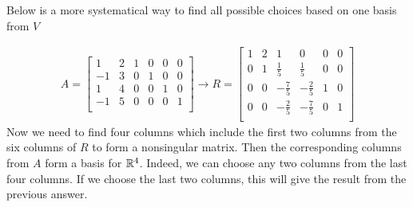\documentclass[pdf,9pt]{beamer}
\begin{document}
\begin{frame}[fragile]
    \begin{emptytitle}
    Below is a more systematical way to find all possible choices based on one basis from $V$
    \end{emptytitle}
    \vfill
    \begin{solution}[method 2.]
	\begin{align*}
	    A= \left[\begin{array}{cc|cccc}
		1  & 2 & 1 & 0 & 0 & 0 \\
		-1 & 3 & 0 & 1 & 0 & 0 \\
		1  & 4 & 0 & 0 & 1 & 0 \\
		-1 & 5 & 0 & 0 & 0 & 1 \\
	    \end{array}\right]
	    \to
	    R = \left[\begin{array}{cc|cccc}
		1 & 2 & 1            & 0            & 0 & 0 \\
		0 & 1 & \frac{1}{5}  & \frac{1}{5}  & 0 & 0 \\
		0 & 0 & -\frac{7}{5} & -\frac{2}{5} & 1 & 0 \\
		0 & 0 & -\frac{2}{5} & -\frac{7}{5} & 0 & 1 \\
	    \end{array}\right]
	\end{align*}
	Now we need to find four columns which include the first two columns from the six
	columns of $R$ to form a nonsingular matrix. Then the corresponding columns from $A$ form a basis for $\mathbb{R}^4$.
	Indeed, we can choose any two columns from the last four columns.
	If we choose the last two columns, this will give the result from the previous answer.
	\myQED
    \end{solution}
\end{frame}
\end{document}
